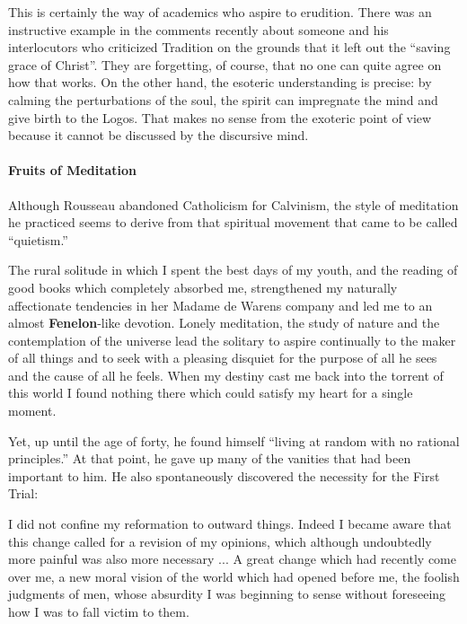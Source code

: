 This is certainly the way of academics who aspire to erudition. There was an instructive example in the comments recently about someone and his interlocutors who criticized Tradition on the grounds that it left out the ``saving grace of Christ''. They are forgetting, of course, that no one can quite agree on how that works. On the other hand, the esoteric understanding is precise: by calming the perturbations of the soul, the spirit can impregnate the mind and give birth to the Logos. That makes no sense from the exoteric point of view because it cannot be discussed by the discursive mind.

\paragraph{Fruits of Meditation}


Although Rousseau abandoned Catholicism for Calvinism, the style of meditation he practiced seems to derive from that spiritual movement that came to be called ``quietism.''

\begin{quotex}
The rural solitude in which I spent the best days of my youth, and the reading of good books which completely absorbed me, strengthened my naturally affectionate tendencies in her Madame de Warens company and led me to an almost \textbf{Fenelon}-like devotion. Lonely meditation, the study of nature and the contemplation of the universe lead the solitary to aspire continually to the maker of all things and to seek with a pleasing disquiet for the purpose of all he sees and the cause of all he feels. When my destiny cast me back into the torrent of this world I found nothing there which could satisfy my heart for a single moment.
\end{quotex}


Yet, up until the age of forty, he found himself ``living at random with no rational principles.'' At that point, he gave up many of the vanities that had been important to him. He also spontaneously discovered the necessity for the First Trial:

\begin{quotex}
I did not confine my reformation to outward things. Indeed I became aware that this change called for a revision of my opinions, which although undoubtedly more painful was also more necessary ... A great change which had recently come over me, a new moral vision of the world which had opened before me, the foolish judgments of men, whose absurdity I was beginning to sense without foreseeing how I was to fall victim to them.
\end{quotex}


